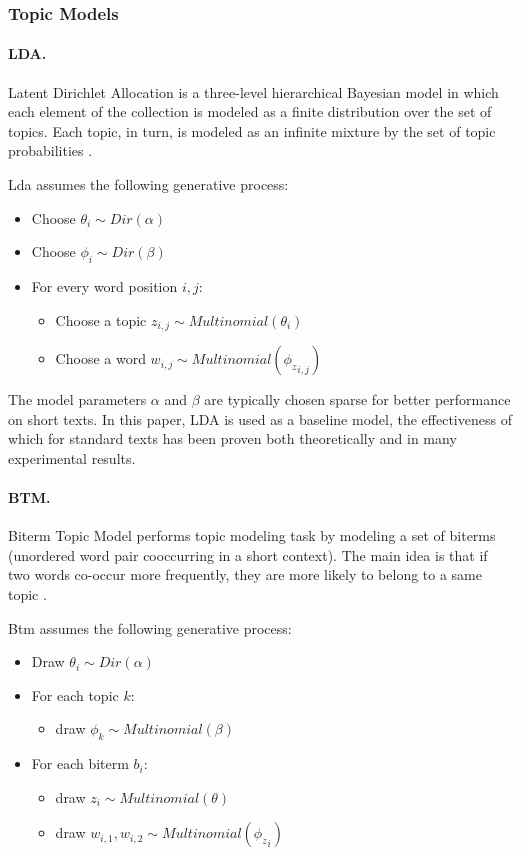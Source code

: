 \subsubsection{Topic Models}

\paragraph{LDA.} Latent Dirichlet Allocation is a three-level hierarchical Bayesian model in which each element of the collection is modeled as a finite distribution over the set of topics. Each topic, in turn, is modeled as an infinite mixture by the set of topic probabilities \cite{MichaelJohnDavidAndrew}.

Lda assumes the following generative process:
\begin{itemize}
	\item Choose \(\theta_i \sim \textit{Dir}(\alpha)\)
	\item Choose \(\phi_i \sim \textit{Dir}(\beta)\)
	\item For every word position \(i, j\):
	\begin{itemize}
		\item Choose a topic \(z_{i, j} \sim \textit{Multinomial}(\theta_i)\)
		\item Choose a word \(w_{i, j} \sim \textit{Multinomial}({\phi_z}_{i,j})\)
	\end{itemize}
\end{itemize}
The model parameters \(\alpha\) and \(\beta\) are typically chosen sparse for better performance on short texts. In this paper, LDA is used as a baseline model, the effectiveness of which for standard texts has been proven both theoretically and in many experimental results.

\paragraph{BTM.} Biterm Topic Model performs topic modeling task by modeling a set of biterms (unordered word pair cooccurring in a short context). The main idea is that if two words co-occur more frequently, they are more likely to belong to a same topic \cite{YanyanJiafengXueqi}.

Btm assumes the following generative process:
\begin{itemize}
	\item Draw \(\theta_i \sim \textit{Dir}(\alpha)\)
	\item For each topic \(k\):
	\begin{itemize}
		\item draw \(\phi_k \sim \textit{Multinomial}(\beta)\)
	\end{itemize}
	\item For each biterm \(b_i\):
	\begin{itemize}
		\item draw \(z_i \sim \textit{Multinomial}(\theta)\)
		\item draw \(w_{i,1},w_{i,2} \sim \textit{Multinomial}({\phi_z}_i)\)
	\end{itemize}
\end{itemize}

